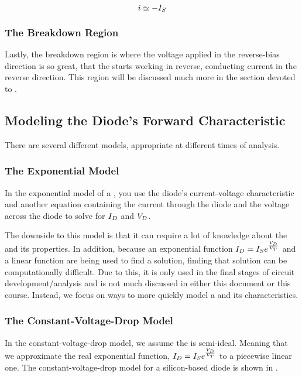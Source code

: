 \begin{equation}\label{eq:Diode_Reverse-Bias-Current_Relation}
  i \simeq - I_{S}
\end{equation}

\subsubsection{The Breakdown Region}\label{subsubsec:Diode_Breakdown_Region}
Lastly, the breakdown region is where the voltage applied in the reverse-bias direction is so great, that the  starts working in reverse, conducting current in the reverse direction.
This region will be discussed much more in the section devoted to .

\subsection{Modeling the Diode's Forward Characteristic}\label{subsec:Modeling_Diode_Forward_Characteristic}
There are several different models, appropriate at different times of analysis.

\subsubsection{The Exponential Model}\label{subsubsec:Exponential_Diode_Model}
In the exponential model of a , you use the diode's current-voltage characteristic and another equation containing the current through the diode and the voltage across the diode to solve for $I_{D}$ and $V_{D}$.

The downside to this model is that it can require a lot of knowledge about the  and its properties.
In addition, because an exponential function $I_{D} = I_{S} e^{\frac{V_{D}}{V_{T}}}$ and a linear function are being used to find a solution, finding that solution can be computationally difficult.
Due to this, it is only used in the final stages of circuit development/analysis and is not much discussed in either this document or this course.
Instead, we focus on ways to more quickly model a  and its characteristics.

\subsubsection{The Constant-Voltage-Drop Model}\label{subsubsec:Constant_Voltage_Drop_Diode_Model}
In the constant-voltage-drop model, we assume the  is semi-ideal.
Meaning that we approximate the real exponential function, $I_{D} = I_{S} e^{\frac{V_{D}}{V_{T}}}$ to a piecewise linear one.
The constant-voltage-drop model for a silicon-based diode is shown in .

